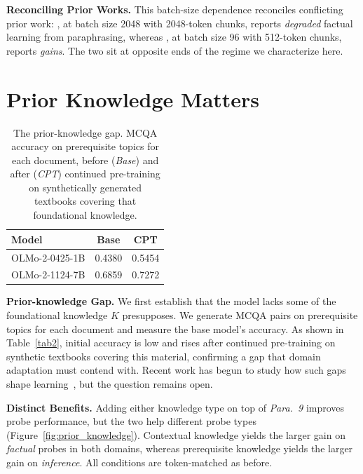 \documentclass[11pt]{article}
\begin{document}
\textbf{Reconciling Prior Works.} This batch-size dependence reconciles conflicting prior work: \citet{chang2024large}, at batch size 2048 with 2048-token chunks, reports \textit{degraded} factual learning from paraphrasing, whereas \citet{allen2024physics}, at batch size 96 with 512-token chunks, reports \textit{gains}. The two sit at opposite ends of the regime we characterize here.

\section{Prior Knowledge Matters}

\begin{table}[h]
\centering
\begin{tabular}{@{} l c c @{}}
\toprule
\textbf{Model} & \textbf{Base} & \textbf{CPT} \\
\midrule
OLMo-2-0425-1B & 0.4380 & 0.5454 \\
OLMo-2-1124-7B & 0.6859 & 0.7272 \\
\bottomrule
\end{tabular}
\caption{The prior-knowledge gap. MCQA accuracy on prerequisite topics for each document, before (\textit{Base}) and after (\textit{CPT}) continued pre-training on synthetically generated textbooks covering that foundational knowledge.}
\label{tab4}
\end{table}

\textbf{Prior-knowledge Gap.} We first establish that the model lacks some of the foundational knowledge $K$ presupposes. We generate MCQA pairs on prerequisite topics for each document and measure the base model's accuracy. As shown in Table~\ref{tab2}, initial accuracy is low and rises after continued pre-training on synthetic textbooks covering this material, confirming a gap that domain adaptation must contend with. Recent work has begun to study how such gaps shape learning~\citep{wang2025objectivefinetuningllmsprior, gekhman2024does, yang2024fine}, but the question remains open.

\textbf{Distinct Benefits.} Adding either knowledge type on top of \textit{Para.\ 9} improves probe performance, but the two help different probe types (Figure~\ref{fig:prior_knowledge}). Contextual knowledge yields the larger gain on \textit{factual} probes in both domains, whereas prerequisite knowledge yields the larger gain on \textit{inference}. All conditions are token-matched as before.
\end{document}
